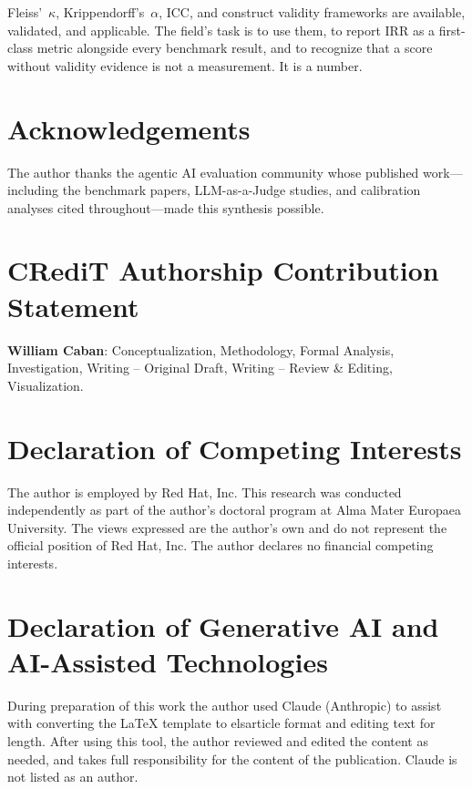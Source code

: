 \documentclass[preprint,12pt]{elsarticle}
\newcommand{\ka}{Krippendorff's~$\alpha$}
\newcommand{\fk}{Fleiss'~$\kappa$}
\begin{document}
\fk, \ka, ICC, and construct validity frameworks are available, validated, and
applicable. The field's task is to use them, to report IRR as a first-class metric
alongside every benchmark result, and to recognize that a score without validity
evidence is not a measurement. It is a number.

\section*{Acknowledgements}

The author thanks the agentic AI evaluation community whose published work---including
the benchmark papers, LLM-as-a-Judge studies, and calibration analyses cited
throughout---made this synthesis possible.


\section*{CRediT Authorship Contribution Statement}

\textbf{William Caban}: Conceptualization, Methodology, Formal Analysis,
Investigation, Writing -- Original Draft, Writing -- Review \& Editing,
Visualization.

\section*{Declaration of Competing Interests}

The author is employed by Red Hat, Inc. This research was conducted independently
as part of the author's doctoral program at Alma Mater Europaea University. The views
expressed are the author's own and do not represent the official position of Red Hat,
Inc. The author declares no financial competing interests.

\section*{Declaration of Generative AI and AI-Assisted Technologies}

During preparation of this work the author used Claude (Anthropic) to assist with
converting the LaTeX template to elsarticle format and editing text for length.
After using this tool, the author reviewed and edited the content as needed, and
takes full responsibility for the content of the publication. Claude is not listed
as an author.
\end{document}
